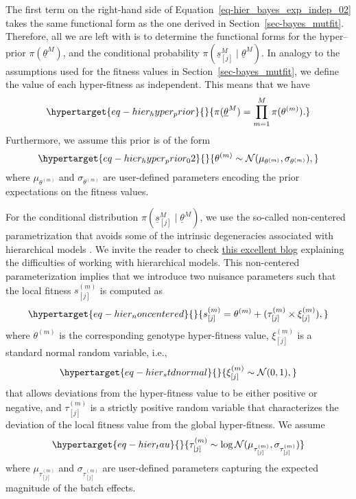 \documentclass[
]{scrartcl}
\begin{document}
\begin{refsegment}
The first term on the right-hand side of
Equation~\ref{eq-hier_bayes_exp_indep_02} takes the same functional form
as the one derived in Section~\ref{sec-bayes_mutfit}. Therefore, all we
are left with is to determine the functional forms for the hyper--prior
\(\pi(\underline{\theta}^M)\), and the conditional probability
\(\pi(\underline{s}^M_{[j]} \mid \underline{\theta}^M)\). In analogy to
the assumptions used for the fitness values in
Section~\ref{sec-bayes_mutfit}, we define the value of each
hyper-fitness as independent. This means that we have
\begin{equation}\protect\hypertarget{eq-hier_hyper_prior}{}{
\pi(\underline{\theta}^M) = \prod_{m=1}^M \pi(\theta^{(m)}).
}\label{eq-hier_hyper_prior}\end{equation} Furthermore, we assume this
prior is of the form
\begin{equation}\protect\hypertarget{eq-hier_hyper_prior_02}{}{
\theta^{(m)} \sim \mathcal{N}(\mu_{\theta^{(m)}}, \sigma_{\theta^{(m)}}),
}\label{eq-hier_hyper_prior_02}\end{equation} where
\(\mu_{\theta^{(m)}}\) and \(\sigma_{\theta^{(m)}}\) are user-defined
parameters encoding the prior expectations on the fitness values.

For the conditional distribution
\(\pi(\underline{s}^M_{[j]} \mid \underline{\theta}^M)\), we use the
so-called non-centered parametrization that avoids some of the intrinsic
degeneracies associated with hierarchical models
\autocite{betancourt2013}. We invite the reader to check
\href{https://betanalpha.github.io/assets/case_studies/hierarchical_modeling.html}{this
excellent blog} explaining the difficulties of working with hierarchical
models. This non-centered parameterization implies that we introduce two
nuisance parameters such that the local fitness \(s_{[j]}^{(m)}\) is
computed as \begin{equation}\protect\hypertarget{eq-hier_noncentered}{}{
s_{[j]}^{(m)} = \theta^{(m)} + 
(\tau_{[j]}^{(m)} \times \xi_{[j]}^{(m)}),
}\label{eq-hier_noncentered}\end{equation} where \(\theta^{(m)}\) is the
corresponding genotype hyper-fitness value, \(\xi_{[j]}^{(m)}\) is a
standard normal random variable, i.e.,
\begin{equation}\protect\hypertarget{eq-hier_stdnormal}{}{
\xi_{[j]}^{(m)} \sim \mathcal{N}(0, 1),
}\label{eq-hier_stdnormal}\end{equation} that allows deviations from the
hyper-fitness value to be either positive or negative, and
\(\tau_{[j]}^{(m)}\) is a strictly positive random variable that
characterizes the deviation of the local fitness value from the global
hyper-fitness. We assume
\begin{equation}\protect\hypertarget{eq-hier_tau}{}{
\tau_{[j]}^{(m)} \sim \log\mathcal{N}(
    \mu_{\tau_{[j]}^{(m)}}, \sigma_{\tau_{[j]}^{(m)}}
)
}\label{eq-hier_tau}\end{equation} where \(\mu_{\tau_{[j]}^{(m)}}\) and
\(\sigma_{\tau_{[j]}^{(m)}}\) are user-defined parameters capturing the
expected magnitude of the batch effects.


\end{refsegment}
\end{document}
